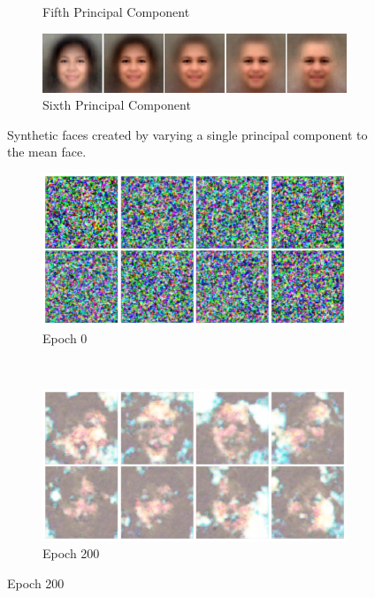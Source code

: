 \begin{figure}
\begin{subfigure}[b]{\textwidth}
        \caption{Fifth Principal Component}
    \end{subfigure}
    \begin{subfigure}[b]{\textwidth}
        \includegraphics[width=\textwidth]{fig/PCA/pca5}
        \caption{Sixth Principal Component}
    \end{subfigure}
    \caption{Synthetic faces created by varying a single principal component to the mean face.}
    \label{pca-components}
\end{figure}

\begin{figure}
    \centering
    \begin{subfigure}[b]{0.45\textwidth}
        \includegraphics[width=\textwidth]{fig/dcgan/ffhq/epoch0}
        \caption{Epoch 0}
    \end{subfigure}
    ~
    \begin{subfigure}[b]{0.45\textwidth}
        \includegraphics[width=\textwidth]{fig/dcgan/ffhq/epoch200}
        \caption{Epoch 200}
    \end{subfigure}


\end{figure}
